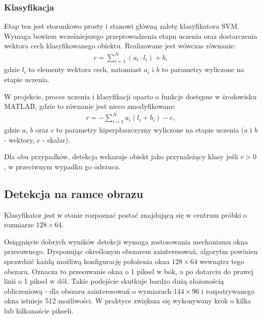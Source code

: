 \subsubsection{Klasyfikacja}
\label{sec:klasyfikacja}
Etap ten jest stosunkowo prosty i stanowi główną zaletę klasyfikatora SVM. 
Wymaga bowiem wcześniejszego przeprowadzenia etapu uczenia oraz dostarczenia wektora cech klasyfikowanego obiektu. 
Realizowane jest wówczas równanie:
\begin{equation}
\label{eq:HOG_classification}
\left.\begin{aligned} 
r=\sum_{i=1}^{N}(a_i\cdot l_i)+b,
\end{aligned}\right.
\end{equation}
gdzie $l_i$ to elementy wektora cech, natomiast $a_i$ i $b$ to parametry wyliczone na etapie uczenia. 

W projekcie, proces uczenia i klasyfikacji oparto o funkcje dostępne w środowisku MATLAB, gdzie to równanie jest nieco zmodyfikowane:
\begin{equation}
\label{eq:HOG_classificationMATLAB}
\left.\begin{aligned} 
r=-\sum_{i=1}^{N}a_i(l_i+b_i)-c,
\end{aligned}\right.
\end{equation}
gdzie $a$, $b$ oraz $c$ to parametry hiperpłaszczyzny wyliczone na etapie uczenia ($a$ i $b$ - wektory, $c$ - skalar).

Dla obu przypadków, detekcja wskazuje obiekt jako przynależący klasy jeśli $r>0$, w przeciwnym wypadku go odrzuca.

\subsection{Detekcja na ramce obrazu}

Klasyfikator jest w stanie rozpoznać postać znajdującą się w centrum próbki o rozmiarze $128\times 64$. 

Osiągnięcie dobrych wyników detekcji wymaga zastosowania mechanizmu okna przesuwnego. Dysponując określonym obszarem zainteresowań, algorytm powinien sprawdzić każdą możliwą konfigurację położenia okna $128\times 64$ wewnątrz tego obszaru. Oznacza to przesuwanie okna o 1 piksel w bok, a po dotarciu do prawej linii o 1 piksel w dół. Takie podejście skutkuje bardzo dużą złożonością obliczeniową - dla obszaru zainteresowań o wymiarach $144\times 96$ i rozpatrywanego okna istnieje 512 możliwości. W praktyce zwiększa się wykonywany krok o kilka lub kilkanaście pikseli.

